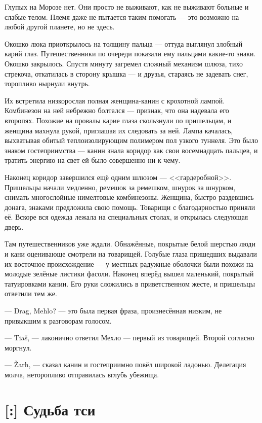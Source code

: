 Глупых на Морозе нет.
Они просто не выживают, как не выживают больные и слабые телом.
Племя даже не пытается таким помогать --- это возможно на любой другой планете, но не здесь.

Окошко люка приоткрылось на толщину пальца --- оттуда выглянул злобный карий глаз.
Путешественники по очереди показали ему пальцами какие-то знаки.
Окошко закрылось.
Спустя минуту загремел сложный механизм шлюза, тихо стрекоча, откатилась в сторону крышка --- и друзья, стараясь не задевать снег, торопливо нырнули внутрь.

Их встретила низкорослая полная женщина-канин с крохотной лампой.
Комбинезон на ней небрежно болтался --- признак, что она надевала его второпях.
Похожие на провалы карие глаза скользнули по пришельцам, и женщина махнула рукой, приглашая их следовать за ней.
Лампа качалась, выхватывая обитый теплоизолирующим полимером пол узкого туннеля.
Это было знаком гостеприимства --- канин знала коридор как свои восемнадцать пальцев, и тратить энергию на свет ей было совершенно ни к чему.

Наконец коридор завершился ещё одним шлюзом --- <<гардеробной>>.
Пришельцы начали медленно, ремешок за ремешком, шнурок за шнурком, снимать многослойные нимелтовые комбинезоны.
Женщина, быстро раздевшись донага, знаками предложила свою помощь.
Товарищи с благодарностью приняли её.
Вскоре вся одежда лежала на специальных столах, и открылась следующая дверь.

Там путешественников уже ждали.
Обнажённые, покрытые белой шерстью люди и кани оценивающе смотрели на товарищей.
Голубые глаза пришедших выдавали их восточное происхождение --- у местных радужные оболочки были похожи на молодые зелёные листики фасоли.
Наконец вперёд вышел маленький, покрытый татуировками канин.
Его руки сложились в приветственном жесте, и пришельцы ответили тем же.

--- Drag\FM, Mehlo? --- это была первая фраза, произнесённая низким, не привыкшим к разговорам голосом.

--- Tia\v{s}\FM, --- лаконично ответил Мехло --- первый из товарищей.
Второй согласно моргнул.

--- \v{Z}arh\FM, --- сказал канин и гостеприимно повёл широкой ладонью.
Делегация молча, неторопливо отправилась вглубь убежища.

\section{[:] Судьба тси}

